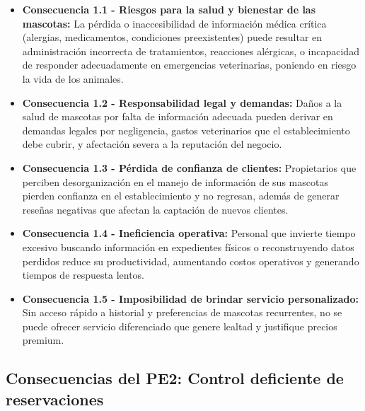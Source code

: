 	\begin{itemize}
		\item \textbf{Consecuencia 1.1 - Riesgos para la salud y bienestar de las mascotas:} La pérdida o inaccesibilidad de información médica crítica (alergias, medicamentos, condiciones preexistentes) puede resultar en administración incorrecta de tratamientos, reacciones alérgicas, o incapacidad de responder adecuadamente en emergencias veterinarias, poniendo en riesgo la vida de los animales.
		
		\item \textbf{Consecuencia 1.2 - Responsabilidad legal y demandas:} Daños a la salud de mascotas por falta de información adecuada pueden derivar en demandas legales por negligencia, gastos veterinarios que el establecimiento debe cubrir, y afectación severa a la reputación del negocio.
		
		\item \textbf{Consecuencia 1.3 - Pérdida de confianza de clientes:} Propietarios que perciben desorganización en el manejo de información de sus mascotas pierden confianza en el establecimiento y no regresan, además de generar reseñas negativas que afectan la captación de nuevos clientes.
		
		\item \textbf{Consecuencia 1.4 - Ineficiencia operativa:} Personal que invierte tiempo excesivo buscando información en expedientes físicos o reconstruyendo datos perdidos reduce su productividad, aumentando costos operativos y generando tiempos de respuesta lentos.
		
		\item \textbf{Consecuencia 1.5 - Imposibilidad de brindar servicio personalizado:} Sin acceso rápido a historial y preferencias de mascotas recurrentes, no se puede ofrecer servicio diferenciado que genere lealtad y justifique precios premium.
	\end{itemize}

\subsection{Consecuencias del PE2: Control deficiente de reservaciones}
\label{sec:consecuencias2}

